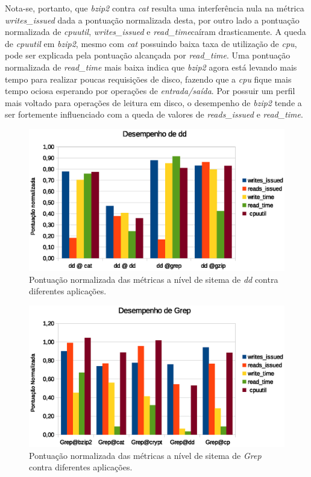 Nota-se, portanto, que \textit{bzip2} contra \textit{cat} resulta uma interferência nula na métrica \textit{writes\_issued} dada a pontuação normalizada desta, por outro lado a pontuação normalizada de \textit{cpuutil}, \textit{writes\_issued} e \textit{read\_time}caíram drasticamente. A queda de \textit{cpuutil} em \textit{bzip2}, mesmo com \textit{cat} possuindo baixa taxa de utilização de \textit{cpu}, pode ser explicada pela pontuação alcançada por \textit{read\_time}. Uma pontuação normalizada de \textit{read\_time} mais baixa indica que \textit{bzip2} agora está levando mais tempo para realizar poucas requisições de disco, fazendo que a \textit{cpu} fique mais tempo ociosa esperando por operações de \textit{entrada/saída}. Por possuir um perfil mais voltado para operações de leitura em disco, o desempenho de \textit{bzip2} tende a ser fortemente influenciado com a queda de valores de \textit{reads\_issued} e \textit{read\_time}.
\begin{figure}[!h]
\centering
\includegraphics [keepaspectratio=true,scale=1.0]{graficos/dd_performance.eps}
\caption{Pontuação normalizada das métricas a nível de sitema de \textit{dd} contra diferentes aplicações.}
\label{dd_performance}
\end{figure}   

\begin{figure}[!h]
\centering
\includegraphics [keepaspectratio=true,scale=1.0]{graficos/grep_performance.eps}
\caption{Pontuação normalizada das métricas a nível de sitema de \textit{Grep} contra diferentes aplicações.}
\label{grep_performance}
\end{figure}   


